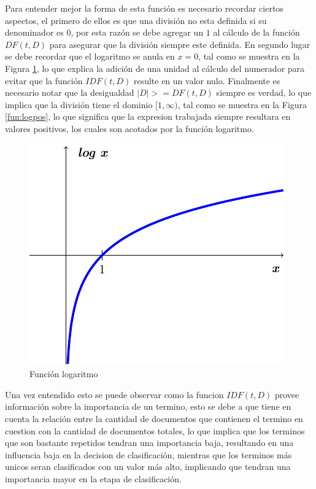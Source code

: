 \documentclass[conference,compsoc]{IEEEtran}
\begin{document}
Para entender mejor la forma de esta función es necesario recordar ciertos aspectos,
el primero de ellos es que una división no esta definida si su denominador es $0$,
por esta razón se debe agregar un $1$ al cálculo de la función $DF(t,D)$ para asegurar
que la división siempre este definida. En segundo lugar se debe recordar que el
logaritmo se anula en $x=0$, tal como se muestra en la Figura \ref{fun:log}, lo que
explica la adición de una unidad al cálculo del numerador para evitar que la función
$IDF(t,D)$ resulte en un valor nulo. Finalmente es necesario notar que la
desigualdad $|D| >= DF(t,D)$ siempre es verdad, lo que implica que la división
tiene el dominio $[1,\infty)$, tal como se muestra en la Figura \ref{fun:logpos},
lo que significa que la expresion trabajada siempre resultara en valores positivos,
los cuales son acotados por la función logaritmo.

\begin{figure}[H]
    \includegraphics[scale=1]{Logarithm.pdf}
    \caption{Función logaritmo}
    \label{fun:log}
\end{figure}

Una vez entendido esto se puede observar como la funcion $IDF(t,D)$ provee información
sobre la importancia de un termino, esto se debe a que tiene en cuenta la relación entre
la cantidad de documentos que contienen el termino en cuestion con la cantidad de
documentos totales, lo que implica que los terminos que son bastante repetidos tendran
una importancia baja, resultando en una influencia baja en la decision de clasificación,
mientras que los terminos más unicos seran clasificados con un valor más alto, implicando
que tendran una importancia mayor en la etapa de clasificación.
\end{document}
